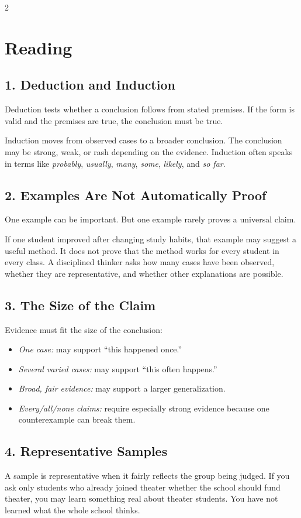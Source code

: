\documentclass[12pt]{article}
\begin{document}
\begin{multicols}{2}
\section*{Reading}

\subsection*{1. Deduction and Induction}
Deduction tests whether a conclusion follows from stated premises. If the form is valid and the premises are true, the conclusion must be true.

Induction moves from observed cases to a broader conclusion. The conclusion may be strong, weak, or rash depending on the evidence. Induction often speaks in terms like \textit{probably}, \textit{usually}, \textit{many}, \textit{some}, \textit{likely}, and \textit{so far}.

\subsection*{2. Examples Are Not Automatically Proof}
One example can be important. But one example rarely proves a universal claim.

If one student improved after changing study habits, that example may suggest a useful method. It does not prove that the method works for every student in every class. A disciplined thinker asks how many cases have been observed, whether they are representative, and whether other explanations are possible.

\subsection*{3. The Size of the Claim}
Evidence must fit the size of the conclusion:
\begin{itemize}[leftmargin=*]
\item \textit{One case:} may support ``this happened once.''
\item \textit{Several varied cases:} may support ``this often happens.''
\item \textit{Broad, fair evidence:} may support a larger generalization.
\item \textit{Every/all/none claims:} require especially strong evidence because one counterexample can break them.
\end{itemize}

\subsection*{4. Representative Samples}
A sample is representative when it fairly reflects the group being judged. If you ask only students who already joined theater whether the school should fund theater, you may learn something real about theater students. You have not learned what the whole school thinks.


\end{multicols}
\end{document}
